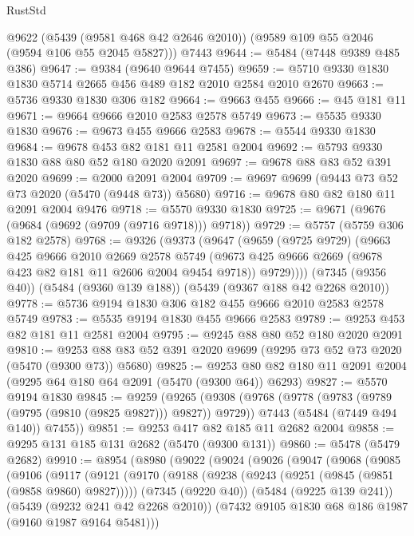 \begin{lexlean}{RustStd}
\begin{coremodule}
{\begin{coremodule}
{{{{{{{{{{{{{{{{{{{{{{{{{{{{{{{      @9622
      (@5439 (@9581 @468 @42 @2646 @2010))
      (@9589 @109 @55 @2046 (@9594 @106 @55 @2045 @5827)))
    @7443
@9644 := @5484 (@7448 @9389 @485 @386)
@9647 := @9384 (@9640 @9644 @7455)
@9659 := @5710 @9330 @1830 @1830 @5714 @2665 @456 @489 @182 @2010 @2584 @2010 @2670
@9663 := @5736 @9330 @1830 @306 @182
@9664 := @9663 @455
@9666 := @45 @181 @11
@9671 := @9664 @9666 @2010 @2583 @2578 @5749
@9673 := @5535 @9330 @1830
@9676 := @9673 @455 @9666 @2583
@9678 := @5544 @9330 @1830
@9684 := @9678 @453 @82 @181 @11 @2581 @2004
@9692 := @5793 @9330 @1830 @88 @80 @52 @180 @2020 @2091
@9697 := @9678 @88 @83 @52 @391 @2020
@9699 := @2000 @2091 @2004
@9709 := @9697 @9699 (@9443 @73 @52 @73 @2020 (@5470 (@9448 @73)) @5680)
@9716 := @9678 @80 @82 @180 @11 @2091 @2004 @9476
@9718 := @5570 @9330 @1830
@9725 := @9671 (@9676 (@9684 (@9692 (@9709 (@9716 @9718))) @9718))
@9729 := @5757 (@5759 @306 @182 @2578)
@9768 := @9326
    (@9373
      (@9647
        (@9659
          (@9725 @9729)
          (@9663
            @425
            @9666
            @2010
            @2669
            @2578
            @5749
            (@9673 @425 @9666 @2669 (@9678 @423 @82 @181 @11 @2606 @2004 @9454 @9718))
            @9729))))
    (@7345 (@9356 @40))
    (@5484 (@9360 @139 @188))
    (@5439 (@9367 @188 @42 @2268 @2010))
@9778 := @5736 @9194 @1830 @306 @182 @455 @9666 @2010 @2583 @2578 @5749
@9783 := @5535 @9194 @1830 @455 @9666 @2583
@9789 := @9253 @453 @82 @181 @11 @2581 @2004
@9795 := @9245 @88 @80 @52 @180 @2020 @2091
@9810 := @9253 @88 @83 @52 @391 @2020 @9699 (@9295 @73 @52 @73 @2020 (@5470 (@9300 @73)) @5680)
@9825 := @9253 @80 @82 @180 @11 @2091 @2004 (@9295 @64 @180 @64 @2091 (@5470 (@9300 @64)) @6293)
@9827 := @5570 @9194 @1830
@9845 := @9259
    (@9265
      (@9308
        (@9768 (@9778 (@9783 (@9789 (@9795 (@9810 (@9825 @9827))) @9827)) @9729))
        @7443
        (@5484 (@7449 @494 @140))
        @7455))
@9851 := @9253 @417 @82 @185 @11 @2682 @2004
@9858 := @9295 @131 @185 @131 @2682 (@5470 (@9300 @131))
@9860 := @5478 (@5479 @2682)
@9910 := @8954
    (@8980
      (@9022
        (@9024
          (@9026
            (@9047
              (@9068
                (@9085
                  (@9106
                    (@9117
                      (@9121
                        (@9170
                          (@9188
                            (@9238 (@9243 (@9251 (@9845 (@9851 (@9858 @9860) @9827)))))
                            (@7345 (@9220 @40))
                            (@5484 (@9225 @139 @241))
                            (@5439 (@9232 @241 @42 @2268 @2010))
                            (@7432 @9105 @1830 @68 @186 @1987 (@9160 @1987 @9164 @5481)))
}}}}}}}}}}}}}}}}}}}}}}}}}}}}}}}
\end{coremodule}}
\end{coremodule}
\end{lexlean}
